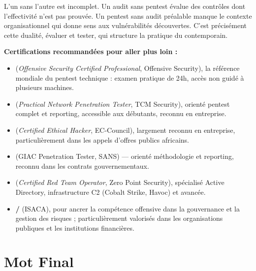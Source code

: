 \medskip
L'un sans l'autre est incomplet. Un audit sans pentest évalue des contrôles
dont l'effectivité n'est pas prouvée. Un pentest sans audit préalable manque
le contexte organisationnel qui donne sens aux vulnérabilités découvertes.
C'est précisément cette dualité, évaluer et tester, qui structure la
pratique du  contemporain.

\begin{boxinfo}
\textbf{Certifications recommandées pour aller plus loin :}
\begin{itemize}
    \item \textbf{} (\textit{Offensive Security Certified
          Professional}, Offensive Security), la référence mondiale du
          pentest technique : examen pratique de 24h, accès non guidé à
          plusieurs machines.
    \item \textbf{} (\textit{Practical Network Penetration
          Tester}, TCM Security), orienté pentest complet et reporting,
          accessible aux débutants, reconnu en entreprise.
    \item \textbf{} (\textit{Certified Ethical Hacker},
          EC-Council), largement reconnu en entreprise, particulièrement
          dans les appels d'offres publics africains.
    \item \textbf{} (GIAC Penetration Tester, SANS) —
          orienté méthodologie et reporting, reconnu dans les contrats
          gouvernementaux.
    \item \textbf{} (\textit{Certified Red Team Operator},
          Zero Point Security), spécialisé Active Directory, infrastructure
          C2 (Cobalt Strike, Havoc) et  avancée.
    \item \textbf{ / } (ISACA), pour ancrer
          la compétence offensive dans la gouvernance  et la
          gestion des risques ; particulièrement valorisés dans les
          organisations publiques et les institutions financières.
\end{itemize}
\end{boxinfo}

\section*{Mot Final}

